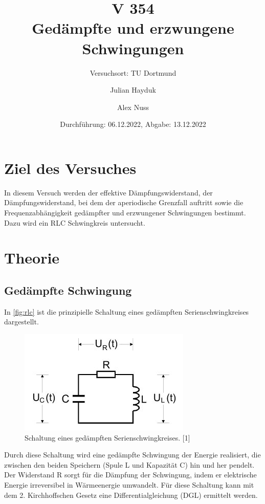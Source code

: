 \documentclass[
  bibliography=totoc,     %
  captions=tableheading,  %
  titlepage=firstiscover, %
]{scrartcl}
\begin{document}
  \setlength{\parindent}{0em} %
  \pagestyle{scrheadings}
  \clearpairofpagestyles
  \ofoot{\pagemark}

  \title{V 354 \\ Gedämpfte und erzwungene Schwingungen}
  \author{Julian Hayduk \and Alex Nuss}
  \date{Durchführung: 06.12.2022, Abgabe: 13.12.2022}
  \subtitle{Versuchsort: TU Dortmund }
  \maketitle

  \thispagestyle{empty}
  \newpage
  
  \tableofcontents
  \thispagestyle{empty}
  \setcounter{page}{1}
  
  \newpage
  \section{Ziel des Versuches}
  
  In diesem Versuch werden der effektive Dämpfungswiderstand, der Dämpfungswiderstand,
  bei dem der aperiodische Grenzfall auftritt sowie die Frequenzabhängigkeit gedämpfter
  und erzwungener Schwingungen bestimmt. Dazu wird ein RLC Schwingkreis
  untersucht.
  
  \section{Theorie}
  
  \label{sec:Theorie}
  \subsection{Gedämpfte Schwingung}
  In \autoref{fig:rlc} ist die prinzipielle Schaltung eines gedämpften Serienschwingkreises dargestellt. 
  \begin{figure}[h]
      \centering
      \includegraphics{rlc.JPG}
      \caption{Schaltung eines gedämpften Serienschwingkreises. [1]}
      \label{fig:rlc}
    \end{figure}
  \noindent 
  Durch diese Schaltung wird eine gedämpfte Schwingung der Energie realisiert, die
  zwischen den beiden Speichern (Spule L und Kapazität C) hin und her pendelt. Der
  Widerstand R sorgt für die Dämpfung der Schwingung, indem er elektrische Energie
  irreversibel in Wärmeenergie umwandelt. Für diese Schaltung kann mit dem 2. Kirchhoffschen
  Gesetz eine Differentialgleichung (DGL) ermittelt werden.
\end{document}
